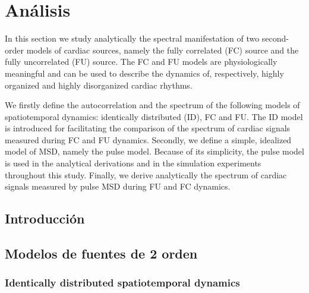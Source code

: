 
\chapter{Análisis}

\begin{resumen}
 In this section we study analytically the spectral manifestation of two
 second-order models of cardiac sources, namely the fully correlated (FC) source
 and the fully uncorrelated (FU) source.  The FC and FU models are
 physiologically meaningful and can be used to describe the dynamics of,
 respectively, highly organized and highly disorganized cardiac rhythms.

 We firstly define the autocorrelation and the spectrum of the following models
 of spatiotemporal dynamics: identically distributed (ID), FC and FU. The ID
 model is introduced for facilitating the comparison of the spectrum of cardiac
 signals measured during FC and FU dynamics. Secondly, we define a simple,
 idealized model of MSD, namely the pulse model. Because of its simplicity, the
 pulse model is used in the analytical derivations and in the simulation
 experiments throughout this study. Finally, we derive analytically the spectrum
 of cardiac signals measured by pulse MSD during FU and FC dynamics.


\end{resumen}

\section{Introducción}
\section{Modelos de fuentes de 2 orden}
\subsection{Identically distributed spatiotemporal dynamics}

%
